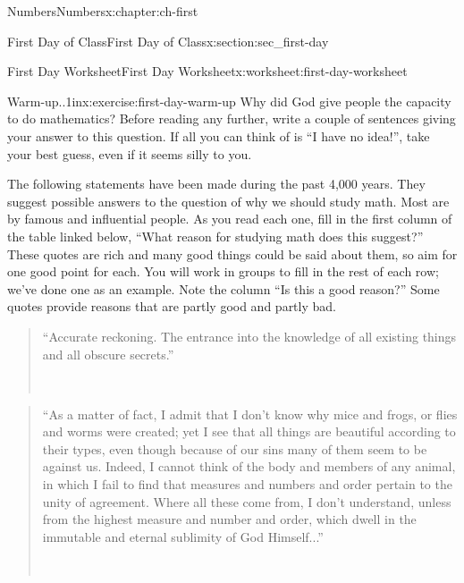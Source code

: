 \documentclass[twoside,10pt,]{book}
\numberwithin{equation}{chapter}
\begin{document}
\begin{chapterptx}{Numbers}{}{Numbers}{}{}{x:chapter:ch-first}
\begin{sectionptx}{First Day of Class}{}{First Day of Class}{}{}{x:section:sec_first-day}
\begin{worksheet-subsection}{First Day Worksheet}{}{First Day Worksheet}{}{}{x:worksheet:first-day-worksheet}
\begin{divisionexercise}{1}{Warm-up..}{1in}{x:exercise:first-day-warm-up}
Why did God give people the capacity to do mathematics?  Before reading any further, write a couple of sentences giving your answer to this question. If all you can think of is ``I have no idea!'', take your best guess, even if it seems silly to you.\end{divisionexercise}%
The following statements have been made during the past 4,000 years.  They suggest possible answers to the question of why we should study math.  Most are by famous and influential people.  As you read each one, fill in the first column of the table linked below, ``What reason for studying math does this suggest?''  These quotes are rich and many good things could be said about them, so aim for one good point for each.  You will work in groups to fill in the rest of each row; we’ve done one as an example.  Note the column ``Is this a good reason?'' Some quotes provide reasons that are partly good and partly bad.%
\begin{quote}%
``Accurate reckoning. The entrance into the knowledge of all existing things and all obscure secrets.''%
\nopagebreak\par%
\hfill{}\\\par
\end{quote}
\begin{quote}%
``As a matter of fact, I admit that I don’t know why mice and frogs, or flies and  worms were created; yet I see that all things are beautiful according to their types, even though because of our sins many of them seem to be against  us.  Indeed, I cannot think of the body and members of any animal, in which I fail to find that measures and numbers and order pertain to the unity of agreement.  Where all these come from, I don’t understand, unless from the highest measure and number and order, which dwell in the immutable and eternal sublimity of God Himself...''%
\nopagebreak\par%
\hfill{}\\\par
\end{quote}
\begin{quote}%

\end{quote}
\end{worksheet-subsection}
\end{sectionptx}
\end{chapterptx}
\end{document}
